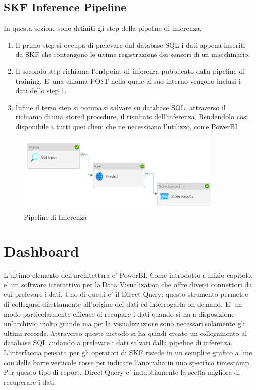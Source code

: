 \subsection{SKF Inference Pipeline}
In questa sezione sono definiti gli step della pipeline di inferenza.
\begin{enumerate}
	\item Il primo step si occupa di prelevare dal database SQL i dati appena inseriti da SKF che contengono le ultime registrazione dei sensori di un macchinario. 
	\item Il secondo step richiama l'endpoint di inferenza pubblicato dalla pipeline di training. E' una chiama POST nella quale al suo interno vengono inclusi i dati dello step 1.
	\item Infine il terzo step si occupa si salvare su database SQL, attraverso il richiamo di una stored procedure, il risultato dell'inferenza. Rendendolo cosi disponibile a tutti quei client che ne necessitano l'utilizzo, come PowerBI
\end{enumerate}

\begin{figure}[t]
	\centering
	\includegraphics[width=10cm, scale=1]{images/pipeline-inference}
	\caption{Pipeline di Inferenza}
	\label{pipeline-inferenza}
\end{figure}

\section{Dashboard}
L'ultimo elemento dell'architettura e' PowerBI. Come introdotto a inizio capitolo, e' un software interattivo per la Data Visualization che offre diversi connettori da cui prelevare i dati. Uno di questi e' il Direct Query: questo strumento permette di collegarsi direttamente all'origine dei dati ed interrogarla on demand. E' un modo particolarmente efficace di recupare i dati quando si ha a disposizione un'archivio molto grande ma per la visualizzazione sono necessari solamente gli ultimi records. 
Attraverso questo metodo si ha quindi creato un collegamento al database SQL andando a prelevare i dati salvati dalla pipeline di inferenza.
L'interfaccia pensata per gli operatori di SKF risiede in un semplice grafico a line con delle barre verticale rosse per indicare l'anomalia in uno specifico timestamp. Per questo tipo di report, Direct Query e' indubbiamente la scelta migliore di recuperare i dati.  


